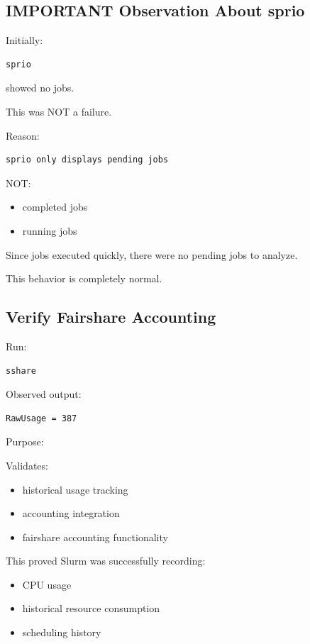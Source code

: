 \documentclass[11pt]{article}
\begin{document}
\subsection{IMPORTANT Observation About sprio}
\label{sec:org74cb1bb}

Initially:

\begin{verbatim}
sprio
\end{verbatim}

showed no jobs.

This was NOT a failure.

Reason:

\begin{verbatim}
sprio only displays pending jobs
\end{verbatim}

NOT:

\begin{itemize}
\item completed jobs
\item running jobs
\end{itemize}

Since jobs executed quickly, there were no pending jobs to analyze.

This behavior is completely normal.
\subsection{Verify Fairshare Accounting}
\label{sec:orgbfd5511}

Run:

\begin{verbatim}
sshare
\end{verbatim}

Observed output:

\begin{verbatim}
RawUsage = 387
\end{verbatim}

Purpose:

Validates:

\begin{itemize}
\item historical usage tracking
\item accounting integration
\item fairshare accounting functionality
\end{itemize}

This proved Slurm was successfully recording:

\begin{itemize}
\item CPU usage
\item historical resource consumption
\item scheduling history
\end{itemize}
\end{document}
